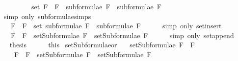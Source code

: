 \begin{isabellebody}
\ \ \ \ \ \ \ \ {\isacharequal}\ set\ {\isacharparenleft}{\isacharparenleft}F{}\ \isactrlbold {\isasymand}\ F{}{\isacharparenright}\ {\isacharhash}\ {\isacharparenleft}subformulae\ F{}\ {\isacharat}\ subformulae\ F{}{\isacharparenright}{\isacharparenright}{\isachardoublequoteclose}\isanewline
\ \ \ \ \isamarkupfalse%
\ {\isacharparenleft}simp\ only{\isacharcolon}\ subformulae{\isachardot}simps{\isacharparenleft}{}{\isacharparenright}{\isacharparenright}\isanewline
\ \ \isamarkupfalse%
\ \isamarkupfalse%
\ {\isachardoublequoteopen}{\isasymdots}\ {\isacharequal}\ {\isacharbraceleft}F{}\ \isactrlbold {\isasymand}\ F{}{\isacharbraceright}\ {\isasymunion}\ {\isacharparenleft}set\ {\isacharparenleft}subformulae\ F{}\ {\isacharat}\ subformulae\ F{}{\isacharparenright}{\isacharparenright}{\isachardoublequoteclose}\isanewline
\ \ \ \ \isamarkupfalse%
\ {\isacharparenleft}simp\ only{\isacharcolon}\ set{\isacharunderscore}insert{\isacharparenright}\isanewline
\ \ \isamarkupfalse%
\ \isamarkupfalse%
\ {\isachardoublequoteopen}{\isasymdots}\ {\isacharequal}\ {\isacharbraceleft}F{}\ \isactrlbold {\isasymand}\ F{}{\isacharbraceright}\ {\isasymunion}\ {\isacharparenleft}setSubformulae\ F{}\ {\isasymunion}\ setSubformulae\ F{}{\isacharparenright}{\isachardoublequoteclose}\isanewline
\ \ \ \ \isamarkupfalse%
\ {\isacharparenleft}simp\ only{\isacharcolon}\ set{\isacharunderscore}append{\isacharparenright}\isanewline
\ \ \isamarkupfalse%
\ \isamarkupfalse%
\ {\isacharquery}thesis\isanewline
\ \ \ \ \isamarkupfalse%
\ this\isanewline
{}\isamarkupfalse%
%
\endisatagproof
{\isafoldproof}%
%
\isadelimproof
\isanewline
%
\endisadelimproof
\isanewline
{}\isamarkupfalse%
\ setSubformulae{\isacharunderscore}or{\isacharcolon}\ \isanewline
\ \ {\isachardoublequoteopen}setSubformulae\ {\isacharparenleft}F{}\ \isactrlbold {\isasymor}\ F{}{\isacharparenright}\ \isanewline
\ \ \ {\isacharequal}\ {\isacharbraceleft}F{}\ \isactrlbold {\isasymor}\ F{}{\isacharbraceright}\ {\isasymunion}\ {\isacharparenleft}setSubformulae\ F{}\ {\isasymunion}\ setSubformulae\ F{}{\isacharparenright}{\isachardoublequoteclose}\isanewline
%
\isadelimproof
%
\endisadelimproof
%
\isatagproof
{}\isamarkupfalse%

\end{isabellebody}
